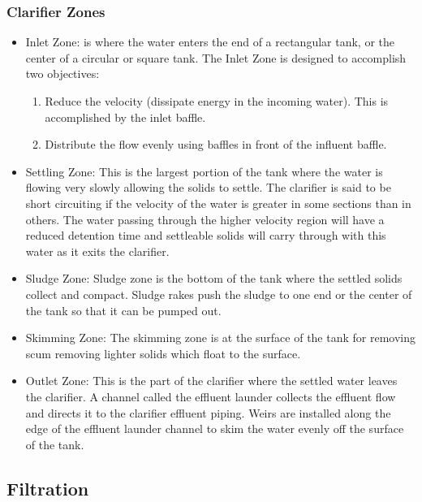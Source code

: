 \subsubsection{Clarifier Zones}		
	\begin{itemize}
		\item Inlet Zone: is where the water enters the end of a rectangular tank, or the center of a circular or square tank. The Inlet Zone is designed to accomplish two objectives:
			\begin{enumerate}
				\item Reduce the velocity (dissipate 									energy in the incoming water).  This is accomplished by the inlet baffle.
				\item Distribute the flow evenly using baffles in front of the influent baffle.
			\end{enumerate}
				
		\item Settling Zone: This is the largest portion of the tank where the water is flowing very slowly allowing the solids to settle.  The clarifier is said to be short circuiting if 		the velocity of the water is greater in some sections than in others. The water passing through the higher velocity region will have a reduced detention time and settleable solids will carry through with this water as it exits the clarifier.
		\item Sludge Zone: Sludge zone is the bottom of the tank where the 	settled solids collect and compact. Sludge rakes push the sludge to one end or the center of the tank so that it can be pumped out. 
		\item Skimming Zone: The skimming zone is at the surface of the tank for removing scum removing
		lighter solids which float to the surface.  
		\item Outlet Zone: This is the part of the clarifier where the settled water leaves the clarifier.  A channel called the effluent launder collects the effluent flow and directs it to the clarifier effluent piping. Weirs are installed along the edge of the effluent launder channel to skim the water evenly off the surface of the tank. 
		\end{itemize}


\subsection{Filtration}
